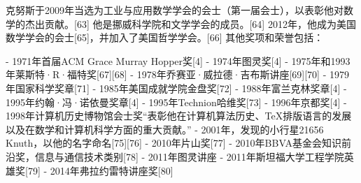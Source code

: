 克努斯于2009年当选为工业与应用数学学会的会士（第一届会士），以表彰他对数学的杰出贡献。[63] 他是挪威科学院和文学学会的成员。[64] 2012年，他成为美国数学学会的会士[65]，并加入了美国哲学学会。[66] 其他奖项和荣誉包括：

- 1971年首届ACM Grace Murray Hopper奖[4]  
- 1974年图灵奖[4]  
- 1975年和1993年莱斯特·R·福特奖[67][68]  
- 1978年乔赛亚·威拉德·吉布斯讲座[69][70]  
- 1979年国家科学奖章[71]  
- 1985年美国成就学院金盘奖[72]  
- 1988年富兰克林奖章[4]  
- 1995年约翰·冯·诺依曼奖章[4]  
- 1995年Technion哈维奖[73]  
- 1996年京都奖[4]  
- 1998年计算机历史博物馆会士奖“表彰他在计算机算法历史、TeX排版语言的发展以及在数学和计算机科学方面的重大贡献。”  
- 2001年，发现的小行星21656 Knuth，以他的名字命名[75][76]  
- 2010年片山奖[77]  
- 2010年BBVA基金会知识前沿奖，信息与通信技术类别[78]  
- 2011年图灵讲座  
- 2011年斯坦福大学工程学院英雄奖[79]  
- 2014年弗拉约雷特讲座奖[80]